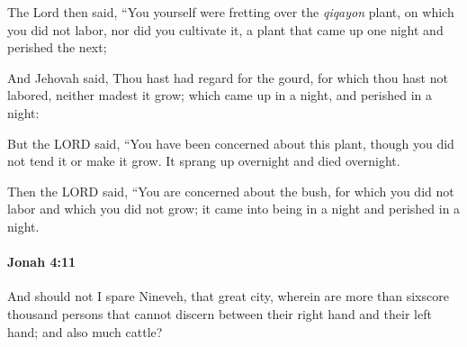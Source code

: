 			\begin{versebox}
					\item[BHS] 
					\item[LXX] 
					\item[AB 1990 300] The Lord then said, ``You yourself were fretting over the \textit{qiqayon} plant, on which you did not labor, nor did you cultivate it, a plant that came up one night and perished the next;
					\item[ASV] And Jehovah said, Thou hast had regard for the gourd, for which thou hast not labored, neither madest it grow; which came up in a night, and perished in a night:
					\item[NIV] But the LORD said, “You have been concerned about this plant, though you did not tend it or make it grow. It sprang up overnight and died overnight.
					\item[NRSV] Then the LORD said, “You are concerned about the bush, for which you did not labor and which you did not grow; it came into being in a night and perished in a night.
			\end{versebox}

		\paragraph{Jonah 4:11} %
			\label{JONAH-4-11}

			And should not I spare Nineveh, that great city, wherein are more than sixscore thousand persons that cannot discern between their right hand and their left hand; and also much cattle?

